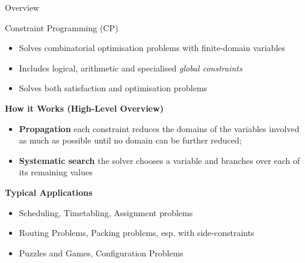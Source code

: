 \documentclass{cons-beamer}
\begin{document}
\begin{frame}{Overview}
\end{frame}


\begin{frame}{Constraint Programming (CP)}
  \begin{itemize}
    \item Solves combinatorial optimisation problems with finite-domain variables
    \item Includes logical, arithmetic and specialised \textit{global constraints}
    \item Solves both satisfaction and optimisation problems
  \end{itemize}
  \vfill

  \textbf{How it Works (High-Level Overview)}  $ $\\
  \begin{itemize}
    \item \textbf{Propagation} each constraint reduces the domains of the variables involved as much as possible until no domain can be further reduced;
    \item \textbf{Systematic search} the solver chooses a variable and branches over each of its remaining values
  \end{itemize}
  \vfill

  \textbf{Typical Applications}
  \begin{itemize}
    \item Scheduling, Timetabling, Assignment problems
    \item Routing Problems, Packing problems, esp. with side-constraints
    \item Puzzles and Games, Configuration Problems
  \end{itemize}
\end{frame}
\end{document}
